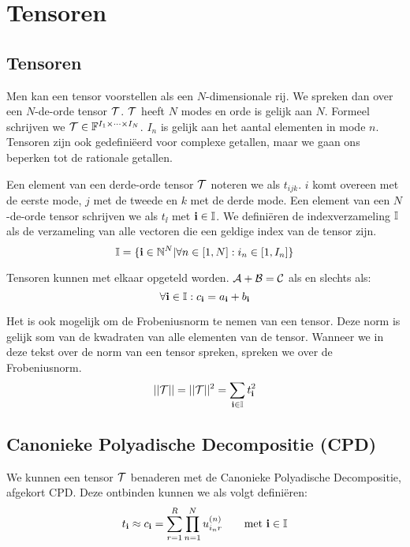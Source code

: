 \chapter{Tensoren}
\label{h:tensoren}


\section{Tensoren}
Men kan een tensor voorstellen als een $N$-dimensionale rij. We spreken dan over een $N$-de-orde tensor $\mathcal{T}$. $\mathcal{T}$ heeft $N$ modes en orde is gelijk aan $N$. Formeel schrijven we $\mathcal{T} \in \mathbb{F}^{I_1 \times \dotsb \times I_N}$. $I_n$ is gelijk aan het aantal elementen in mode $n$. Tensoren zijn ook gedefini\"eerd voor complexe getallen, maar we gaan ons beperken tot de rationale getallen.


Een element van een derde-orde tensor $\mathcal{T}$ noteren we als $t_{ijk}$. $i$ komt overeen met de eerste mode, $j$ met de tweede en $k$ met de derde mode. Een element van een $N$-de-orde tensor schrijven we als $t_\ii$ met $\textbf{i} \in \mathbb{I}$. We defini\"eren de indexverzameling $\mathbb{I}$ als de verzameling van alle vectoren die een geldige index van de tensor zijn.
\[
    \mathbb{I} = \{\textbf{i} \in \mathbb{N}^N | \forall n \in [1, N]: i_n \in [1, I_n]\}
\]


Tensoren kunnen met elkaar opgeteld worden. $\mathcal{A} + \mathcal{B} = \mathcal{C}$ als en slechts als:
\[
	\forall \textbf{i} \in \mathbb{I}: c_{\textbf{i}} = a_{\textbf{i}} + b_{\textbf{i}}
\]

Het is ook mogelijk om de Frobeniusnorm te nemen van een tensor. Deze norm is gelijk som van de kwadraten van alle elementen van de tensor. Wanneer we in deze tekst over de norm van een tensor spreken, spreken we over de Frobeniusnorm.
\[
    ||\mathcal{T}|| = ||\mathcal{T}||^2 = \sum_{\textbf{i} \in \mathbb{I}} t_{\textbf{i}}^2
\]


\section{Canonieke Polyadische Decompositie (CPD)}
We kunnen een tensor $\mathcal{T}$ benaderen met de Canonieke Polyadische Decompositie, afgekort CPD. Deze ontbinden kunnen we als volgt defini\"eren:
\[
    t_{\textbf{i}} \approx c_{\textbf{i}} = \sum_{r=1}^{R} \prod_{n=1}^{N} u^{(n)}_{i_{n}r} \qquad \text{met $\textbf{i} \in \mathbb{I}$}
\]

